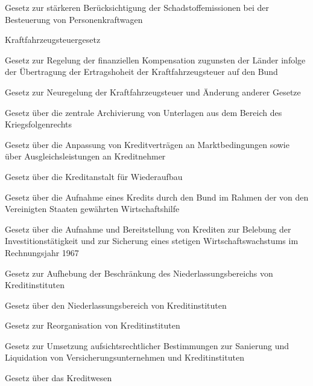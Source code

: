 \item[{KraftStÄndG-1997}] Gesetz zur stärkeren Berücksichtigung der Schadstoffemissionen bei der Besteuerung von Personenkraftwagen

\item[{KraftStG}] Kraftfahrzeugsteuergesetz

\item[{KraftStKompG}] Gesetz zur Regelung der finanziellen Kompensation zugunsten der Länder infolge der Übertragung der Ertragshoheit der Kraftfahrzeugsteuer auf den Bund

\item[{KraftStNRG}] Gesetz zur Neuregelung der Kraftfahrzeugsteuer und Änderung anderer Gesetze

\item[{KrArchG}] Gesetz über die zentrale Archivierung von Unterlagen aus dem Bereich des Kriegsfolgenrechts

\item[{KredAAG}] Gesetz über die Anpassung von Kreditverträgen an Marktbedingungen sowie über Ausgleichsleistungen an Kreditnehmer

\item[{KredAnstWiAG}] Gesetz über die Kreditanstalt für Wiederaufbau

\item[{KredAufnG}] Gesetz über die Aufnahme eines Kredits durch den Bund im Rahmen der von den Vereinigten Staaten gewährten Wirtschaftshilfe

\item[{KredFinG-1967}] Gesetz über die Aufnahme und Bereitstellung von Krediten zur Belebung der Investitionstätigkeit und zur Sicherung eines stetigen Wirtschaftswachstums im Rechnungsjahr 1967

\item[{KredInstNdlAufhG}] Gesetz zur Aufhebung der Beschränkung des Niederlassungsbereichs von Kreditinstituten

\item[{KredInstNdlG}] Gesetz über den Niederlassungsbereich von Kreditinstituten

\item[{KredReorgG}] Gesetz zur Reorganisation von Kreditinstituten

\item[{KredSanG}] Gesetz zur Umsetzung aufsichtsrechtlicher Bestimmungen zur Sanierung und Liquidation von Versicherungsunternehmen und Kreditinstituten

\item[{KredWG}] Gesetz über das Kreditwesen

